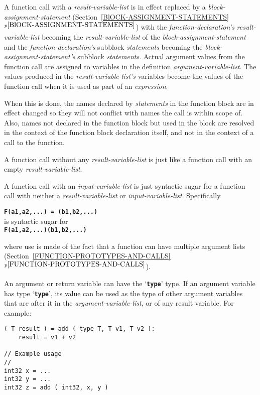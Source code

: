 \documentclass[12pt]{article}
\newcommand{\TT}[1]{{\tt \bfseries #1}}
\newcommand{\itemref}[1]{\ref{#1}$^{p\pageref{#1}}$}
\newcommand{\EOL}{\penalty \exhyphenpenalty}
\newenvironment{indpar}[1][0.3in]%
	{\begin{list}{}%
		     {\setlength{\itemsep}{0in}%
		      \setlength{\topsep}{0in}%
		      \setlength{\parsep}{1ex}%
		      \setlength{\labelwidth}{#1}%
		      \setlength{\leftmargin}{#1}%
		      \addtolength{\leftmargin}{\labelsep}}%
	 \item}%
	{\end{list}}
\begin{document}
A function call with a {\em result-variable-list}
is in effect replaced by a {\em block-assignment-statement}
(Section~\itemref{BlOCK-ASSIGNMENT-STATEMENTS})
with the {\em function-declaration's} {\em result-variable-list} becoming the 
{\em result-variable-list} of the {\em block-assignment-statement} and the
{\em function-declaration's} subblock {\em statements} becoming the 
{\em block-\EOL assign\-ment-\EOL state\-ment's} subblock {\em statements}.
Actual argument values from the function call are assigned to variables in
the definition {\em argument-variable-list}.  The values produced in
the {\em result-variable-list's} variables become the values of the
function call when it is used as part of an {\em expression}.

When this is done, the names declared by {\em statements} in the
function block are in effect changed so they will not conflict
with names the call is within scope of.  Also, names not declared
in the function block but used in the block are resolved
in the context of the function block declaration itself,
and not in the context of a call to the function.

A function call without any {\em result-variable-list}
is just like a function call with an empty
{\em result-variable-list}.

A function call with an {\em input-variable-list} is just syntactic
sugar for a function call with neither a {\em result-variable-list}
or {\em input-variable-list}.  Specifically
\begin{center}
\TT{F(a1,a2,...)~=~(b1,b2,...)} \\
is syntactic sugar for \\
\TT{F(a1,a2,...)(b1,b2,...)} \\
\end{center}

where use is made of the fact that a function can have multiple
argument lists (Section~\itemref{FUNCTION-PROTOTYPES-AND-CALLS}).

An argument or return variable can have the `\TT{type}' type.
If an argument variable has type `\TT{type}', its value can be used as the
type of other argument variables that are
after it in the {\em argument-variable-list},
or of any result variable.  For example:

\begin{indpar}\begin{verbatim}
( T result ) = add ( type T, T v1, T v2 ):
    result = v1 + v2

// Example usage
//
int32 x = ...
int32 y = ...
int32 z = add ( int32, x, y )
\end{verbatim}\end{indpar}
\end{document}
